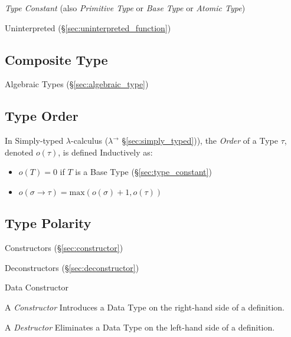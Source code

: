 \emph{Type Constant} (also \emph{Primitive Type} or \emph{Base Type}
or \emph{Atomic Type})

Uninterpreted (\S\ref{sec:uninterpreted_function}) %



\subsection{Composite Type}\label{sec:composite_type}

Algebraic Types (\S\ref{sec:algebraic_type})



\subsection{Type Order}\label{sec:type_order}

In Simply-typed $\lambda$-calculus ($\lambda^\rightarrow$
\S\ref{sec:simply_typed})), the \emph{Order} of a Type $\tau$, denoted
$o(\tau)$, is defined Inductively as:
\begin{itemize}
\item $o(T) = 0$ if $T$ is a Base Type (\S\ref{sec:type_constant})
\item $o(\sigma \rightarrow \tau) = \text{max}(o(\sigma) + 1,
  o(\tau))$
\end{itemize}



\subsection{Type Polarity}\label{sec:type_polarity}

Constructors (\S\ref{sec:constructor})

Deconstructors (\S\ref{sec:deconstructor})


\asterism


Data Constructor

A \emph{Constructor} Introduces a Data Type on the right-hand side of
a definition.

A \emph{Destructor} Eliminates a Data Type on the left-hand side of a
definition.

